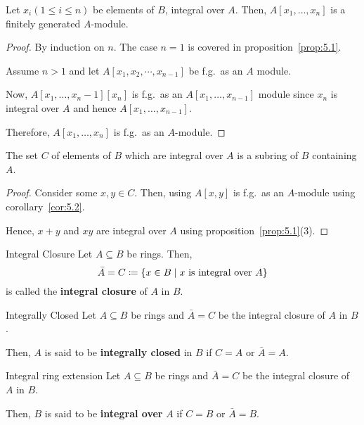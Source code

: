 \begin{corollary}{}{}
\label{cor:5.2}
	Let \(x_i (1 \leq i \leq n)\) be elements of \(B\), integral over \(A\).
	Then, \(A[x_1, \ldots, x_n]\) is a finitely generated \(A\)-module.
\end{corollary}
\begin{proof}
	By induction on \(n\).
	The case \(n = 1\) is covered in proposition~\ref{prop:5.1}.

	Assume \(n > 1\) and let \(A[x_1, x_2, \cdots, x_{n-1}]\) be f.g.\
	as an \(A\) module.

	Now, \(A[x_1, \ldots, x_n-1][x_n]\) is f.g.\ as an
	\(A[x_1, \ldots, x_{n-1}]\) module since \(x_n\) is integral over
	\(A\) and hence \(A[x_1, \ldots, x_{n-1}]\).

	Therefore, \(A[x_1, \ldots, x_n]\) is f.g.\ as an \(A\)-module.
\end{proof}


\begin{corollary}{}{}
\label{cor:5.3}
	The set \(C\) of elements of \(B\) which are integral over \(A\) is
	a subring of \(B\) containing \(A\).
\end{corollary}
\begin{proof}
	Consider some \(x, y \in C\).
	Then, using \(A[x, y]\) is f.g.\ as an \(A\)-module using
	corollary~\ref{cor:5.2}.

	Hence, \(x + y\) and \(xy\) are integral over \(A\) using
	proposition~\ref{prop:5.1}(3).
\end{proof}


\begin{defn}{Integral Closure}{}
	Let \(A \subseteq B\) be rings.
	Then,
	\[
		\bar{A} = C \coloneqq
		\left\{ x \in B \mid x \text{ is integral over } A \right\}
	\]
	is called the \textbf{integral closure} of \(A\) in \(B\).
\end{defn}

\begin{defn}{Integrally Closed}{}
	Let \(A \subseteq B\) be rings and \(\bar{A} = C\) be the
	integral closure of \(A\) in \(B\).

	Then, \(A\) is said to be \textbf{integrally closed} in \(B\)
	if \(C = A\) or \(\bar{A} = A\).
\end{defn}

\begin{defn}{Integral ring extension}{}
	Let \(A \subseteq B\) be rings and \(\bar{A} = C\) be the
	integral closure of \(A\) in \(B\).

	Then, \(B\) is said to be \textbf{integral over} \(A\) if \(C = B\)
	or \(\bar{A} = B\).
\end{defn}

